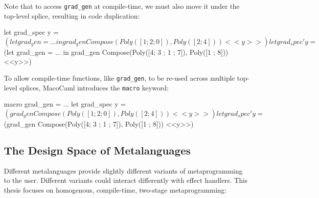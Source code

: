Note that to access \texttt{grad_gen} at compile-time, we must also move it under the top-level splice, resulting in code duplication:

\begin{macocaml}
let grad_spec y  = $(let grad_gen = ... in 
                     grad_gen Compose(Poly([1 ; 2 ; 0]), Poly([2 ; 4])) <<y>>) 
let grad_spec' y = $(let grad_gen = ... in 
                     grad_gen Compose(Poly([4; 3 ; 1 ; 7]), Poly([1 ; 8])) <<y>>) 
\end{macocaml}

To allow compile-time functions, like \texttt{grad_gen}, to be re-used across multiple top-level splices, MacoCaml introduces the \texttt{macro} keyword:

\begin{macocaml}
macro grad_gen = ...  
let grad_spec y  = $(grad_gen Compose(Poly([1 ; 2 ; 0]), Poly([2 ; 4])) <<y>>) 
let grad_spec' y = $(grad_gen Compose(Poly([4; 3 ; 1 ; 7]), Poly([1 ; 8])) <<y>>) 
\end{macocaml}


\subsection{The Design Space of Metalanguages}\label{subsection:metaprogramming-design}
Different metalanguages provide slightly different variants of metaprogramming to the user. Different variants could interact differently with effect handlers. This thesis focuses on homogenous, compile-time, two-stage metaprogramming: 

